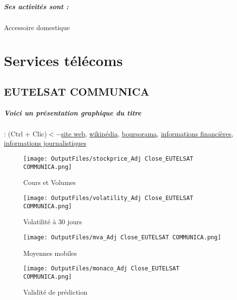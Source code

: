 \documentclass[11pt,a4paper]{report}%
\begin{document}
\paragraph{Ses activités sont : } Accessoire domestique 
    
    \newpage\chapter{Services télécoms}


\section{EUTELSAT COMMUNICA}

\paragraph{Voici un présentation graphique du titre} : (Ctrl + Clic)$<-$\href{https://www.eutelsat.com/fr/investisseurs.html}{site web}, \href{https://fr.wikipedia.org/wiki/Eutelsat}{wikipédia}, \href{https://www.boursorama.com/cours/1rPETL}{boursorama}, \href{https://www.qwant.com/?q=site:https:%2f%2fwww.easybourse.com%2faction-societe%2fEUTELSAT-COMMUNICA&t=web&client=ext-firefox-hp}{informations financières}, \href{https://bourse.lerevenu.com/cours-de-bourse/fiche-valeur-synthese/EUTELSAT-COMMUNICA/ETL-FR}{informations journalistiques}
\begin{figure}[!htb]
   \begin{minipage}{0.5\textwidth}
     \centering
     \texttt{[image: OutputFiles/stockprice\_Adj Close\_EUTELSAT COMMUNICA.png]}
     \caption{Cours et Volumes}\label{Fig:price_EUTELSAT COMMUNICA}
   \end{minipage}\hfill
   \begin{minipage}{0.5\textwidth}
     \centering
     \texttt{[image: OutputFiles/volatility\_Adj Close\_EUTELSAT COMMUNICA.png]}
     \caption{Volatilité à 30 jours}\label{Fig:volat_EUTELSAT COMMUNICA}
   \end{minipage}
\end{figure}
\begin{figure}[!htb]
   \begin{minipage}{0.5\textwidth}
     \centering
     \texttt{[image: OutputFiles/mva\_Adj Close\_EUTELSAT COMMUNICA.png]}
     \caption{Moyennes mobiles}\label{Fig:mva_EUTELSAT COMMUNICA}
   \end{minipage}\hfill
   \begin{minipage}{0.5\textwidth}
     \centering
     \texttt{[image: OutputFiles/monaco\_Adj Close\_EUTELSAT COMMUNICA.png]}
     \caption{Validité de prédiction}\label{Fig:prediction_EUTELSAT COMMUNICA}
   \end{minipage}
\end{figure}
\end{document}
